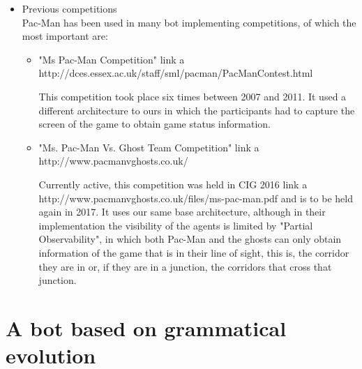 \documentclass{llncs}
\newcommand{\paco}{Pac-Man }
\begin{document}
\begin{itemize}
We've greatly increased the information to obtain by combining those given functions, like getting a movement towards the closest junction, the closest edible ghost, or the closest powerpill.

The original code also comes with various examples of controllers like random movements for \paco and the ghosts, aggressive behavioured ghosts, or a basic one for \paco that takes into account if the surrounding ghosts are edible or not.
\\
\\

\item Previous competitions
\\

\paco has been used in many bot implementing competitions, of which the most important are:

\begin{itemize}
\setlength{\itemindent}{-.3cm}
\item "Ms Pac-Man Competition"{\color{red} link a http://dces.essex.ac.uk/staff/sml/pacman/PacManContest.html}

This competition took place six times between 2007 and 2011. It used a different architecture to ours in which the participants had to capture the screen of the game to obtain game status information. 
\item "Ms. Pac-Man Vs. Ghost Team Competition"{\color{red} link a http://www.pacmanvghosts.co.uk/}

Currently active, this competition was held in CIG 2016{\color{red} link a http://www.pacmanvghosts.co.uk/files/ms-pac-man.pdf} and is to be held again in 2017. It uses our same base architecture, although in their implementation the visibility of the agents is limited by "Partial Observability", in which both \paco and the ghosts can only obtain information of the game that is in their line of sight, this is, the corridor they are in or, if they are in a junction, the corridors that cross that junction.
\end{itemize}

 


\end{itemize}


%
\section{A bot based on grammatical evolution}
\label{sec:sec1}
%
\end{document}

